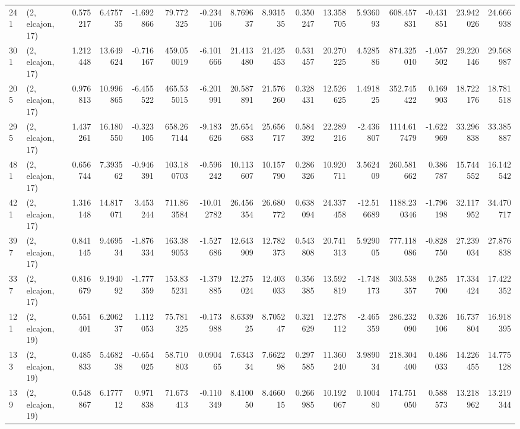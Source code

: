 \begin{tabular}{llrrrrrrrrrrrrrr}
241 &  (2, elcajon, 17) &   0.575217 &   6.475735 &  -1.692866 &    79.772325 &  -0.234106 &   8.769637 &   8.931535 &  0.350247 &  13.358705 &   5.936093 &   608.457831 &  -0.431851 &  23.942026 &  24.666938 \\
301 &  (2, elcajon, 17) &   1.212448 &  13.649624 &  -0.716167 &   459.050019 &  -6.101666 &  21.413480 &  21.425453 &  0.531457 &  20.270225 &   4.528586 &   874.325010 &  -1.057502 &  29.220146 &  29.568987 \\
205 &  (2, elcajon, 17) &   0.976813 &  10.996865 &  -6.455522 &   465.535015 &  -6.201991 &  20.587891 &  21.576260 &  0.328431 &  12.526625 &   1.491825 &   352.745422 &   0.169903 &  18.722176 &  18.781518 \\
295 &  (2, elcajon, 17) &   1.437261 &  16.180550 &  -0.323105 &   658.267144 &  -9.183626 &  25.654683 &  25.656717 &  0.584392 &  22.289216 &  -2.436807 &  1114.617479 &  -1.622969 &  33.296838 &  33.385887 \\
481 &  (2, elcajon, 17) &   0.656744 &   7.393562 &  -0.946391 &   103.180703 &  -0.596242 &  10.113607 &  10.157790 &  0.286326 &  10.920711 &   3.562409 &   260.581662 &   0.386787 &  15.744552 &  16.142542 \\
421 &  (2, elcajon, 17) &   1.316148 &  14.817071 &   3.453244 &   711.863584 & -10.012782 &  26.456354 &  26.680772 &  0.638094 &  24.337458 & -12.516689 &  1188.230346 &  -1.796198 &  32.117952 &  34.470717 \\
397 &  (2, elcajon, 17) &   0.841145 &   9.469534 &  -1.876334 &   163.389053 &  -1.527686 &  12.643909 &  12.782373 &  0.543808 &  20.741313 &   5.929005 &   777.118086 &  -0.828750 &  27.239034 &  27.876838 \\
337 &  (2, elcajon, 17) &   0.816679 &   9.194092 &  -1.777359 &   153.835231 &  -1.379885 &  12.275024 &  12.403033 &  0.356385 &  13.592819 &  -1.748173 &   303.538357 &   0.285700 &  17.334424 &  17.422352 \\
121 &  (2, elcajon, 19) &   0.551401 &   6.206237 &   1.112053 &    75.781325 &  -0.173988 &   8.633925 &   8.705247 &  0.321629 &  12.278112 &  -2.465359 &   286.232090 &   0.326106 &  16.737804 &  16.918395 \\
133 &  (2, elcajon, 19) &   0.485833 &   5.468238 &  -0.654025 &    58.710803 &   0.090465 &   7.634334 &   7.662298 &  0.297585 &  11.360240 &   3.989034 &   218.304400 &   0.486033 &  14.226455 &  14.775128 \\
139 &  (2, elcajon, 19) &   0.548867 &   6.177712 &   0.971838 &    71.673413 &  -0.110349 &   8.410050 &   8.466015 &  0.266985 &  10.192067 &   0.100480 &   174.751050 &   0.588573 &  13.218962 &  13.219344 \\

\end{tabular}

